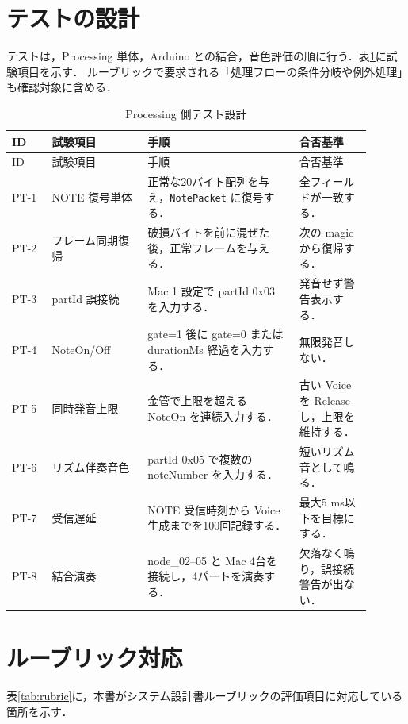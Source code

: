 \documentclass[lualatex,book,openany,paper=a4paper,jafontsize=11.5pt,jafontscale=1.05]{jlreq}
\begin{document}
\section{テストの設計}
テストは，Processing 単体，Arduino との結合，音色評価の順に行う．表\ref{tab:tests}に試験項目を示す．
ルーブリックで要求される「処理フローの条件分岐や例外処理」も確認対象に含める．

\begin{longtable}{p{0.10\linewidth}p{0.24\linewidth}p{0.38\linewidth}p{0.18\linewidth}}
\caption{Processing 側テスト設計}\label{tab:tests}\\
\hline
ID & 試験項目 & 手順 & 合否基準 \\
\hline
\endfirsthead
\hline
ID & 試験項目 & 手順 & 合否基準 \\
\hline
\endhead
PT-1 & NOTE 復号単体 & 正常な20バイト配列を与え，\texttt{NotePacket} に復号する． & 全フィールドが一致する． \\
\hline
PT-2 & フレーム同期復帰 & 破損バイトを前に混ぜた後，正常フレームを与える． & 次の magic から復帰する． \\
\hline
PT-3 & partId 誤接続 & Mac 1 設定で partId 0x03 を入力する． & 発音せず警告表示する． \\
\hline
PT-4 & NoteOn/Off & gate=1 後に gate=0 または durationMs 経過を入力する． & 無限発音しない． \\
\hline
PT-5 & 同時発音上限 & 金管で上限を超える NoteOn を連続入力する． & 古い Voice を Release し，上限を維持する． \\
\hline
PT-6 & リズム伴奏音色 & partId 0x05 で複数の noteNumber を入力する． & 短いリズム音として鳴る． \\
\hline
PT-7 & 受信遅延 & NOTE 受信時刻から Voice 生成までを100回記録する． & 最大5 ms以下を目標にする． \\
\hline
PT-8 & 結合演奏 & node\_02--05 と Mac 4台を接続し，4パートを演奏する． & 欠落なく鳴り，誤接続警告が出ない． \\
\hline
\end{longtable}

\section{ルーブリック対応}
表\ref{tab:rubric}に，本書がシステム設計書ルーブリックの評価項目に対応している箇所を示す．
\end{document}

